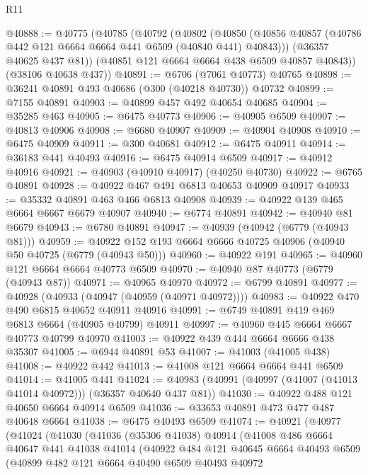 \begin{lexlean}{R11}
\begin{coremodule}
@40888 := @40775
    (@40785
      (@40792
        (@40802
          (@40850 (@40856 @40857 (@40786 @442 @121 @6664 @6664 @441 @6509 (@40840 @441) @40843)))
          (@36357 @40625 @437 @81))
        (@40851 @121 @6664 @6664 @438 @6509 @40857 @40843))
      (@38106 @40638 @437))
@40891 := @6706 (@7061 @40773) @40765
@40898 := @36241 @40891 @493 @40686 (@300 (@40218 @40730)) @40732
@40899 := @7155 @40891
@40903 := @40899 @457 @492 @40654 @40685
@40904 := @35285 @463
@40905 := @6475 @40773
@40906 := @40905 @6509
@40907 := @40813 @40906
@40908 := @6680 @40907
@40909 := @40904 @40908
@40910 := @6475 @40909
@40911 := @300 @40681
@40912 := @6475 @40911
@40914 := @36183 @441 @40493
@40916 := @6475 @40914 @6509
@40917 := @40912 @40916
@40921 := @40903 (@40910 @40917) (@40250 @40730)
@40922 := @6765 @40891
@40928 := @40922 @467 @491 @6813 @40653 @40909 @40917
@40933 := @35332 @40891 @463 @466 @6813 @40908
@40939 := @40922 @139 @465 @6664 @6667 @6679 @40907
@40940 := @6774 @40891
@40942 := @40940 @81 @6679
@40943 := @6780 @40891
@40947 := @40939 (@40942 (@6779 (@40943 @81)))
@40959 := @40922 @152 @193 @6664 @6666 @40725 @40906 (@40940 @50 @40725 (@6779 (@40943 @50)))
@40960 := @40922 @191
@40965 := @40960 @121 @6664 @6664 @40773 @6509
@40970 := @40940 @87 @40773 (@6779 (@40943 @87))
@40971 := @40965 @40970
@40972 := @6799 @40891
@40977 := @40928 (@40933 (@40947 (@40959 (@40971 @40972))))
@40983 := @40922 @470 @490 @6815 @40652 @40911 @40916
@40991 := @6749 @40891 @419 @469 @6813 @6664 (@40905 @40799) @40911
@40997 := @40960 @445 @6664 @6667 @40773 @40799 @40970
@41003 := @40922 @439 @444 @6664 @6666 @438 @35307
@41005 := @6944 @40891 @53
@41007 := @41003 (@41005 @438)
@41008 := @40922 @442
@41013 := @41008 @121 @6664 @6664 @441 @6509
@41014 := @41005 @441
@41024 := @40983 (@40991 (@40997 (@41007 (@41013 @41014 @40972))) (@36357 @40640 @437 @81))
@41030 := @40922 @488 @121 @40650 @6664 @40914 @6509
@41036 := @33653 @40891 @473 @477 @487 @40648 @6664
@41038 := @6475 @40493 @6509
@41074 := @40921
    (@40977
      (@41024
        (@41030
          (@41036
            (@35306 @41038)
            @40914
            (@41008
              @486
              @6664
              @40647
              @441
              @41038
              @41014
              (@40922
                @484
                @121
                @40645
                @6664
                @40493
                @6509
                (@40899
                  @482
                  @121
                  @6664
                  @40490
                  @6509
                  @40493
                  @40972

\end{coremodule}
\end{lexlean}
